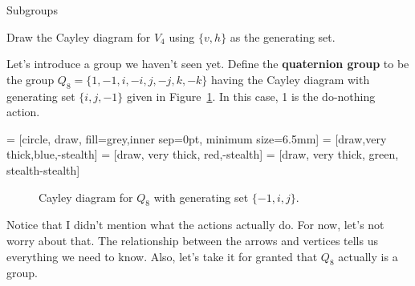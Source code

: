 \begin{section}{Subgroups}
\begin{exercise}\label{exer:V4}
Draw the Cayley diagram for $V_4$ using $\{v,h\}$ as the generating set.
\end{exercise}

Let's introduce a group we haven't seen yet.  Define the \textbf{quaternion group} to be the group $Q_8=\{1,-1,i,-i,j,-j,k,-k\}$ having the Cayley diagram with generating set $\{i, j, -1\}$ given in Figure~\ref{fig:Q8}.  In this case, 1 is the do-nothing action.

 = [circle, draw, fill=grey,inner sep=0pt, minimum size=6.5mm]
 = [draw,very thick,blue,-stealth]
 = [draw, very thick, red,-stealth]
 = [draw, very thick, green, stealth-stealth]

\begin{figure}[!ht]
\centering
{}
\caption{Cayley diagram for $Q_8$ with generating set $\{-1, i, j\}$.}\label{fig:Q8}
\end{figure}

Notice that I didn't mention what the actions actually do.  For now, let's not worry about that.  The relationship between the arrows and vertices tells us everything we need to know.  Also, let's take it for granted that $Q_8$ actually is a group.


\end{section}

